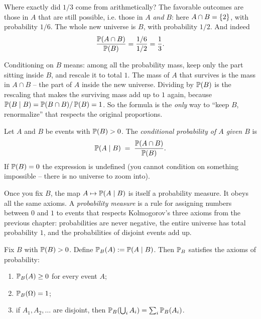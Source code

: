 Where exactly did $1/3$ come from arithmetically? The favorable outcomes are those in $A$ that are still possible, i.e. those in $A$ \emph{and} $B$: here $A \cap B = \set{2}$, with probability $1/6$. The whole new universe is $B$, with probability $1/2$. And indeed
\[
\frac{\P(A \cap B)}{\P(B)} = \frac{1/6}{1/2} = \frac{1}{3}.
\]
\begin{whybox}
Conditioning on $B$ means: among all the probability mass, keep only the part sitting inside $B$, and rescale it to total $1$. The mass of $A$ that survives is the mass in $A \cap B$ -- the part of $A$ inside the new universe. Dividing by $\P(B)$ is the rescaling that makes the surviving mass add up to $1$ again, because $\P(B \given B) = \P(B\cap B)/\P(B) = 1$. So the formula is the \emph{only} way to ``keep $B$, renormalize'' that respects the original proportions.
\end{whybox}

\begin{definition}
\label{ch04:def-condprob}
Let $A$ and $B$ be events with $\P(B) > 0$. The \emph{conditional probability of $A$ given $B$} is
\[
\P(A \given B) \;=\; \frac{\P(A \cap B)}{\P(B)}.
\]
If $\P(B) = 0$ the expression is undefined (you cannot condition on something impossible -- there is no universe to zoom into).
\end{definition}

Once you fix $B$, the map $A \mapsto \P(A \given B)$ is itself a probability measure. It obeys all the same axioms. A \emph{probability measure} is a rule for assigning numbers between $0$ and $1$ to events that respects Kolmogorov's three axioms from the previous chapter: probabilities are never negative, the entire universe has total probability $1$, and the probabilities of disjoint events add up.

\begin{proposition}
\label{ch04:cond-is-measure}
Fix $B$ with $\P(B) > 0$. Define $\P_B(A) := \P(A \given B)$. Then $\P_B$ satisfies the axioms of probability:
\begin{enumerate}
\item $\P_B(A) \ge 0$ for every event $A$;
\item $\P_B(\Omega) = 1$;
\item if $A_1, A_2, \dots$ are disjoint, then $\P_B\!\left(\bigcup_i A_i\right) = \sum_i \P_B(A_i)$.
\end{enumerate}
\end{proposition}

